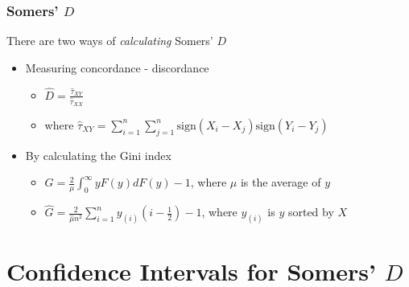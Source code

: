 \documentclass{beamer}
\begin{document}

\begin{frame}
\frametitle{Somers' $D$}

There are two ways of \emph{calculating} Somers' $D$
\begin{itemize}
    \item Measuring concordance - discordance
    \begin{itemize}
        \item $\hat{D} = \frac{\hat{\tau}_{XY}}{\hat{\tau}_{XX}}$
        \item where $\hat{\tau}_{XY} = \sum_{i = 1}^{n} \sum_{j = 1}^{n} \mathrm{sign}(X_i - X_j)\mathrm{sign}(Y_i - Y_j)$
    \end{itemize}
    \item By calculating the Gini index
    \begin{itemize}
        \item $G = \frac{2}{\mu} \int_{0}^{\infty} yF(y)dF(y) - 1$,
            where $\mu$ is the average of $y$
        \item $\hat{G} = \frac{2}{\hat{\mu}n^2} \sum_{i = 1}^{n} y_{(i)}(i - \frac{1}{2}) - 1$,
            where $y_{(i)}$ is $y$ sorted by $X$
    \end{itemize}
\end{itemize}

\end{frame}


\section{Confidence Intervals for Somers' $D$}


\end{document}
